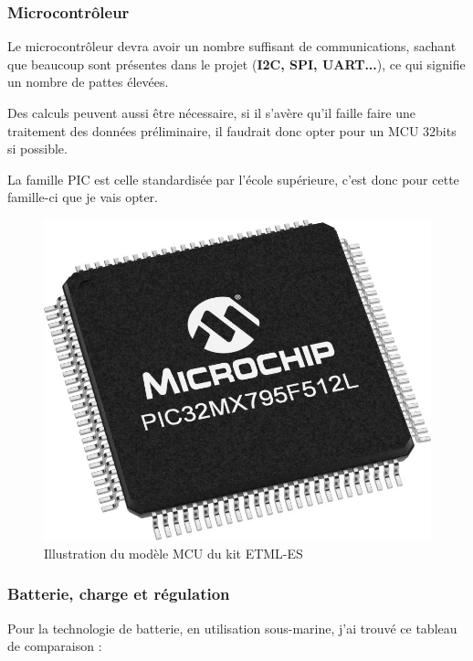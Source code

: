 {{    
}

\subsubsection{Microcontrôleur}
{
    Le microcontrôleur devra avoir un nombre suffisant de communications, sachant que beaucoup sont présentes dans le projet (\textbf{I2C, SPI, UART...}), ce qui signifie un nombre de pattes élevées. 
    
    
    Des calculs peuvent aussi être nécessaire, si il s'avère qu'il faille faire une traitement des données préliminaire, il faudrait donc opter pour un MCU 32bits si possible.


    La famille PIC est celle standardisée par l'école supérieure, c'est donc pour cette famille-ci que je vais opter.
    \vspace{+12pt} \\

    \begin{figure}[h] 
        \centering
        \includegraphics[width=.4\textwidth]{Figures/PIC32MX795F512L-V7X-Regular}
        \caption{Illustration du modèle MCU du kit ETML-ES}
        \label{fig:MCU}
    \end{figure}
    
}

\clearpage

\subsubsection{Batterie, charge et régulation}
{

Pour la technologie de batterie, en utilisation sous-marine, j'ai trouvé ce tableau de comparaison :

}}
